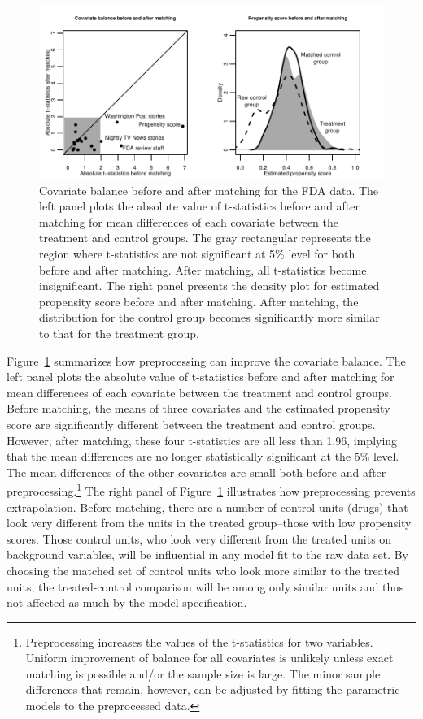 \documentclass[11pt,titlepage]{article}
\begin{document}
\begin{figure}[t] 
 \begin{center}
    \includegraphics{figs/fdabal.pdf}
  \end{center}
  \vspace{-0.275in}
  \caption{Covariate balance before and after matching for the FDA data.
    The left panel plots the absolute value of t-statistics before and
    after matching for mean differences of each covariate between the
    treatment and control groups. The gray rectangular represents the
    region where t-statistics are not significant at 5\% level for
    both before and after matching. After matching, all t-statistics
    become insignificant. The right panel presents the density plot
    for estimated propensity score before and after matching. After
    matching, the distribution for the control group becomes
    significantly more similar to that for the treatment group.  }
  \label{fg:fdabal}
\end{figure}

Figure~\ref{fg:fdabal} summarizes how preprocessing can improve the
covariate balance. The left panel plots the absolute value of
t-statistics before and after matching for mean differences of each
covariate between the treatment and control groups.  Before matching,
the means of three covariates and the estimated propensity score
are significantly different between the treatment and control groups.
However, after matching, these four t-statistics are all less than 1.96,
implying that the mean differences are no longer statistically
significant at the 5\% level. The mean differences of the other
covariates are small both before and after
preprocessing.\footnote{Preprocessing increases the values of the
  t-statistics for two variables. Uniform improvement of balance
  for all covariates is unlikely unless exact matching is possible
  and/or the sample size is large. The minor sample differences that remain,
  however, can be adjusted by fitting the parametric models to the
  preprocessed data.} The right panel of Figure~\ref{fg:fdabal}
illustrates how preprocessing prevents extrapolation. Before matching,
there are a number of control units (drugs) that look very different from the
units in the treated group--those with low propensity scores.  Those control units,
who look very different from the treated units on background variables, 
will be influential in any model fit to the raw data set.
By choosing the matched set of control units who look more similar to the treated units, 
the treated-control comparison will be among only similar units and thus not affected 
as much by the model specification.
\end{document}
